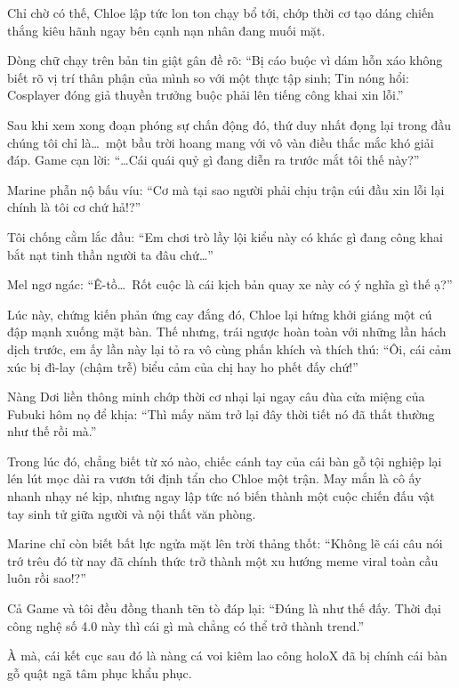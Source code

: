\documentclass[../main.tex]{subfiles}
\begin{document}
Chỉ chờ có thế, Chloe lập tức lon ton chạy bổ tới, chớp thời cơ tạo dáng chiến thắng kiêu hãnh ngay bên cạnh nạn nhân đang muối mặt.

Dòng chữ chạy trên bản tin giật gân đề rõ: ``Bị cáo buộc vì dám hỗn xáo không biết rõ vị trí thân phận của mình so với một thực tập sinh; Tin nóng hổi: Cosplayer đóng giả thuyền trưởng buộc phải lên tiếng công khai xin lỗi.''

Sau khi xem xong đoạn phóng sự chấn động đó, thứ duy nhất đọng lại trong đầu chúng tôi chỉ là\dots\ một bầu trời hoang mang với vô vàn điều thắc mắc khó giải đáp. Game cạn lời: ``\dots Cái quái quỷ gì đang diễn ra trước mắt tôi thế này?''


Marine phẫn nộ bấu víu: ``Cơ mà tại sao người phải chịu trận cúi đầu xin lỗi lại chính là tôi cơ chứ hả!?''

Tôi chống cằm lắc đầu: ``Em chơi trò lầy lội kiểu này có khác gì đang công khai bắt nạt tinh thần người ta đâu chứ\dots''

Mel ngơ ngác: ``Ê-tồ\dots\ Rốt cuộc là cái kịch bản quay xe này có ý nghĩa gì thế ạ?''

Lúc này, chứng kiến phản ứng cay đắng đó, Chloe lại hứng khởi giáng một cú đập mạnh xuống mặt bàn. Thế nhưng, trái ngược hoàn toàn với những lần hách dịch trước, em ấy lần này lại tỏ ra vô cùng phấn khích và thích thú: ``Ôi, cái cảm xúc bị đì-lay (chậm trễ) biểu cảm của chị hay ho phết đấy chứ!''

Nàng Dơi liền thông minh chớp thời cơ nhại lại ngay câu đùa cửa miệng của Fubuki hôm nọ để khịa: ``Thì mấy năm trở lại đây thời tiết nó đã thất thường như thế rồi mà.''

Trong lúc đó, chẳng biết từ xó nào, chiếc cánh tay của cái bàn gỗ tội nghiệp lại lén lút mọc dài ra vươn tới định tẩn cho Chloe một trận. May mắn là cô ấy nhanh nhạy né kịp, nhưng ngay lập tức nó biến thành một cuộc chiến đấu vật tay sinh tử giữa người và nội thất văn phòng.

Marine chỉ còn biết bất lực ngửa mặt lên trời thảng thốt: ``Không lẽ cái câu nói trớ trêu đó từ nay đã chính thức trở thành một xu hướng meme viral toàn cầu luôn rồi sao!?''

Cả Game và tôi đều đồng thanh tẽn tò đáp lại: ``Đúng là như thế đấy. Thời đại công nghệ số 4.0 này thì cái gì mà chẳng có thể trở thành trend.''

À mà, cái kết cục sau đó là nàng cá voi kiêm lao công holoX đã bị chính cái bàn gỗ quật ngã tâm phục khẩu phục.
\end{document}

